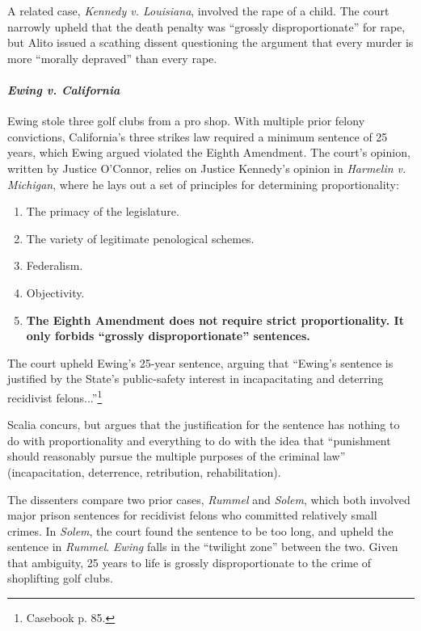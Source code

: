 A related case, \emph{Kennedy v. Louisiana}, involved the rape of a child. The court narrowly upheld that the death penalty was ``grossly disproportionate'' for rape, but Alito issued a scathing dissent questioning the argument that every murder is more ``morally depraved'' than every rape.

\paragraph{\emph{Ewing v. California}} Ewing stole three golf clubs from a pro shop. With multiple prior felony convictions, California's three strikes law required a minimum sentence of 25 years, which Ewing argued violated the Eighth Amendment. The court's opinion, written by Justice O'Connor, relies on Justice Kennedy's opinion in \emph{Harmelin v. Michigan}, where he lays out a set of principles for determining proportionality:

\begin{enumerate}
    \item The primacy of the legislature.
    \item The variety of legitimate penological schemes.
    \item Federalism.
    \item Objectivity.
    \item \textbf{The Eighth Amendment does not require strict proportionality. It only forbids ``grossly disproportionate'' sentences.}
\end{enumerate}

The court upheld Ewing's 25-year sentence, arguing that ``Ewing's sentence is justified by the State's public-safety interest in incapacitating and deterring recidivist felons...''\footnote{Casebook p. 85.}

Scalia concurs, but argues that the justification for the sentence has nothing to do with proportionality and everything to do with the idea that ``punishment should reasonably pursue the multiple purposes of the criminal law'' (incapacitation, deterrence, retribution, rehabilitation).

The dissenters compare two prior cases, \emph{Rummel} and \emph{Solem}, which both involved major prison sentences for recidivist felons who committed relatively small crimes. In \emph{Solem}, the court found the sentence to be too long, and upheld the sentence in \emph{Rummel}. \emph{Ewing} falls in the ``twilight zone'' between the two. Given that ambiguity, 25 years to life is grossly disproportionate to the crime of shoplifting golf clubs.
